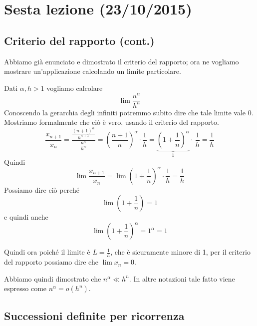 \chapter{Sesta lezione (23/10/2015)}

\section{Criterio del rapporto (cont.)}

Abbiamo già enunciato e dimostrato il criterio del rapporto; ora ne vogliamo mostrare un'applicazione calcolando un limite particolare.

\begin{example}
Dati $\alpha, h > 1$ vogliamo calcolare
\begin{equation*}
\lim \frac{n^\alpha}{h^n}
\end{equation*}
Conoscendo la gerarchia degli infiniti potremmo subito dire che tale limite vale 0. Mostriamo formalmente che ciò è vero, usando il criterio del rapporto.
\begin{equation*}
\frac{x_{n+1}}{x_n} = \frac{\frac{(n+1)^\alpha}{h^{n+1}}}{\frac{n^\alpha}{h^n}} = \left(\frac{n+1}{n}\right)^\alpha \cdot \frac{1}{h} = \underbrace{\left(1+\frac{1}{n}\right)^\alpha}_{1} \cdot \, \frac{1}{h} = \frac{1}{h}
\end{equation*}
Quindi
\begin{equation*}
\lim \frac{x_{n+1}}{x_n} = \lim \left(1+\frac{1}{n}\right)^\alpha \cdot \frac{1}{h} = \frac{1}{h}
\end{equation*}
Possiamo dire ciò perché
\begin{equation*}
\lim \left(1+\frac{1}{n}\right) = 1
\end{equation*}
e quindi anche
\begin{equation*}
\lim \left(1+\frac{1}{n}\right)^\alpha = 1^\alpha = 1
\end{equation*}

Quindi ora poiché il limite è $L = \frac{1}{h}$, che è sicuramente minore di 1, per il criterio del rapporto possiamo dire che $\lim x_n = 0$.

Abbiamo quindi dimostrato che $n^\alpha \ll h^n$. In altre notazioni tale fatto viene espresso come $n^\alpha = o(h^n)$.
\end{example}

\section{Successioni definite per ricorrenza}

